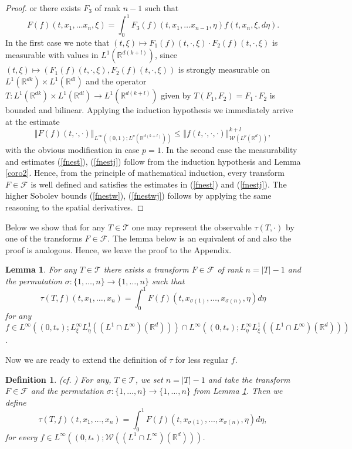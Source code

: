 \documentclass[10pt]{article}
\newtheorem{defi}{Definition}
\newtheorem{lemma}{Lemma}
\newcommand*{\norm}[1]{\left\Vert{#1}\right\Vert}
\newcommand{\R}{\mathbb{R}}
\newcommand{\izj}{\int_{0}^{1}}
\newcommand{\Tree}{\mathcal{T}}
\newcommand{\W}{\mathcal{W}}
\begin{document}
\begin{proof}
or there exists $F_3$ of rank $n-1$ such that
\[
F(f)(t,x_1,\dots x_n,\xi) = \izj F_{3}(f)(t,x_1,\dots x_{n-1},\eta)f(t,x_n,\xi,d \eta).
\]
In the first case we note that $(t,\xi)\mapsto F_{1}(f)(t,\cdot,\xi)\cdot F_{2}(f)(t,\cdot,\xi)$ is measurable with values in $L^{1}(\R^{d(k+l)})$, since $(t,\xi)\mapsto (F_{1}(f)(t,\cdot,\xi), F_{2}(f)(t,\cdot,\xi))$ is strongly measurable on $L^{1}(\R^{dk})\times L^{1}(\R^{dl})$ and the operator $T:L^{1}(\R^{dk})\times L^{1}(\R^{dl})\rightarrow L^{1}(\R^{d(k+l)})$ given by $T(F_1,F_2) = F_1 \cdot F_2$ is bounded and bilinear.
Applying the induction hypothesis we immediately arrive at the estimate 
\[
\norm{F(f)(t,\cdot,\cdot)}_{L^{\infty}((0,1);L^{p}( \R^{d(k+l)}))} \leq \norm{f(t,\cdot,\cdot,\cdot)}^{k+l}_{\W( L^p(\R^d))},
\]
with the obvious modification in case $p=1$.
In the second case the measurability and estimates (\ref{fnest}), (\ref{fnestj}) follow from the induction hypothesis and Lemma \ref{coro2}.
Hence, from the principle of mathematical induction, every  transform $F\in \mathcal{F}$ is well defined and satisfies the estimates in (\ref{fnest}) and (\ref{fnestj}).  The higher Sobolev bounds (\ref{fnestw}), (\ref{fnestwj}) follows by applying the same reasoning to the spatial derivatives.
\end{proof}

Below we show that for any $T \in \Tree$  one may represent the observable $\tau(T,\cdot)$ by one of the transforms $F \in \mathcal{F}$. The lemma below is an equivalent of \cite[Lemma 5.4]{JPS2025} and also the proof is analogous. Hence, we leave the proof to the Appendix.

\begin{lemma}\label{ftau}
 For any $T\in \Tree$   there exists a transform $F\in \mathcal{F}$ of rank $n=|T|-1$ and the permutation $\sigma:\{1,\dots,n\}\rightarrow \{1,\dots,n\}$  such that    \[
 \tau(T,f)(t,x_1,\dots,x_n) = \izj F(f)(t,x_{\sigma(1)},\dots,x_{\sigma(n)},\eta)d\eta
 \]
 for any $f\in L^\infty((0,t_{*});L^{\infty}_\xi L^1_\eta ( (L^1\cap L^{\infty})(\R^d)))\cap L^\infty((0,t_{*});L^{\infty}_\eta L^1_\xi ( (L^1\cap L^{\infty})(\R^d)))$.
 \end{lemma}
 
 Now we are ready to extend the definition of $\tau$ for less regular $f$.
 \begin{defi}\label{deftf}(cf. \cite[Definition 5.5]{JPS2025})
   For any, $T\in \Tree$,  we set $n=|T|-1$ and take the transform $F\in \mathcal{F}$ and  the permutation $\sigma:\{1,\dots,n\}\rightarrow \{1,\dots,n\}$ from Lemma \ref{ftau}. Then we define 
\[
\tau(T,f)(t,x_1,\dots,x_n) = \izj F(f)(t,x_{\sigma(1)},\dots,x_{\sigma(n)},\eta)d\eta,
\]  
for every $f\in L^\infty((0,t_{*});\W((L^1\cap L^{\infty})(\R^d)))$.
 \end{defi}
\end{document}
